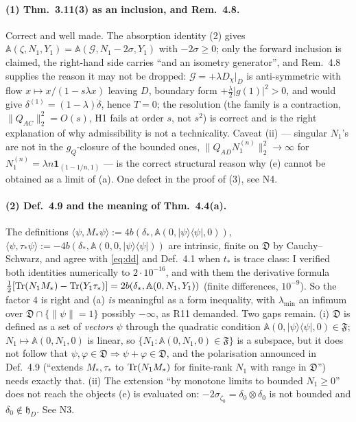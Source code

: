 \documentclass[11pt]{article}
\newcommand{\hh}{\mathfrak h}
\newcommand{\Aop}{\mathbb A}
\begin{document}
\paragraph{(1) Thm.~3.11(3) as an inclusion, and Rem.~4.8.}  Correct and well made.  The
absorption identity (2) gives $\Aop(\zeta,N_1,Y_1)=\Aop(\mathcal G,N_1-2\sigma,Y_1)$ with
$-2\sigma\ge0$; only the forward inclusion is claimed, the right-hand side carries ``and an
isometry generator'', and Rem.~4.8 supplies the reason it may not be dropped:
$\mathcal G=+\lambda D_\chi|_D$ is anti-symmetric with flow $x\mapsto x/(1-s\lambda x)$
leaving $D$, boundary form $+\frac\lambda2|g(1)|^2>0$, and would give
$\delta^{(1)}=(1-\lambda)\dot\delta$, hence $T=0$; the resolution (the family is a
contraction, $\|Q_{AC}\|_2^2=O(s)$, H1 fails at order $s$, not $s^2$) is correct and is the
right explanation of why admissibility is not a technicality.  Caveat (ii) --- singular
$N_1$'s are not in the $g_Q$-closure of the bounded ones,
$\|Q_{AD}N_1^{(n)}\|_2^2\to\infty$ for $N_1^{(n)}=\lambda n\mathbf 1_{(1-1/n,1)}$ --- is the
correct structural reason why (e) cannot be obtained as a limit of (a).  One defect in the
proof of (3), see N4.

\paragraph{(2) Def.~4.9 and the meaning of Thm.~4.4(a).}  The definitions
$\langle\psi,M_*\psi\rangle:=4b(\delta_*,\Aop(0,|\psi\rangle\langle\psi|,0))$,
$\langle\psi,\tau_*\psi\rangle:=-4b(\delta_*,\Aop(0,0,|\psi\rangle\langle\psi|))$ are
intrinsic, finite on $\mathfrak D$ by Cauchy--Schwarz, and agree with \eqref{eq:dd} and
Def.~4.1 when $t_*$ is trace class: I verified both identities numerically to
$2\cdot10^{-16}$, and with them the derivative formula
$\frac12[\Tr(N_1M_*)-\Tr(Y_1\tau_*)]=2b(\delta_*,\Aop(0,N_1,Y_1))$ (finite differences,
$10^{-9}$).  So the factor $4$ is right and (a) \emph{is} meaningful as a form inequality,
with $\lambda_{\min}$ an infimum over $\mathfrak D\cap\{\|\psi\|=1\}$ possibly $-\infty$, as
R11 demanded.  Two gaps remain.  (i) $\mathfrak D$ is defined as a set of \emph{vectors}
$\psi$ through the quadratic condition $\Aop(0,|\psi\rangle\langle\psi|,0)\in\mathfrak F$;
$N_1\mapsto\Aop(0,N_1,0)$ is linear, so $\{N_1:\Aop(0,N_1,0)\in\mathfrak F\}$ is a subspace,
but it does not follow that $\psi,\varphi\in\mathfrak D\Rightarrow\psi+\varphi\in\mathfrak D$,
and the polarisation announced in Def.~4.9 (``extends $M_*,\tau_*$ to $\operatorname{Tr}(N_1M_*)$ for
finite-rank $N_1$ with range in $\mathfrak D$'') needs exactly that.  (ii) The extension
``by monotone limits to bounded $N_1\ge0$'' does not reach the objects (e) is evaluated on:
$-2\sigma_{\zeta_0}=\delta_0\otimes\delta_0$ is not bounded and $\delta_0\notin\hh_D$.  See
N3.
\end{document}

